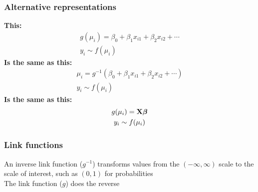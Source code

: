 \documentclass[color=usenames,dvipsnames]{beamer}\usepackage[]{graphicx}\usepackage[]{color}
\begin{document}
\begin{frame}
  \frametitle{Alternative representations}
  {\bf This:}
  \begin{gather*}
    g(\mu_i) = \beta_0 + \beta_1 x_{i1} + \beta_2 x_{i2} + \cdots \\
    y_i \sim f(\mu_i)
  \end{gather*}
  \pause
  {\bf Is the same as this:}
  \begin{gather*}
    \mu_i = g^{-1}(\beta_0 + \beta_1 x_{i1} + \beta_2 x_{i2} + \cdots) \\
    y_i \sim f(\mu_i)
  \end{gather*}
  \pause
  {\bf Is the same as this:}
  \begin{gather*}
    g(\mu_i) = {\bf X}{\bm \beta} \\
    y_i \sim f(\mu_i)
  \end{gather*}
\end{frame}


\begin{frame}
  \frametitle{Link functions}
  An inverse link function ($g^{-1}$) transforms values from the $(-\infty,\infty)$
  scale to the scale of interest, such as $(0,1)$ for probabilities  \\
  \pause
  \vfill
  The link function ($g$) does the reverse \\
\end{frame}
\end{document}
